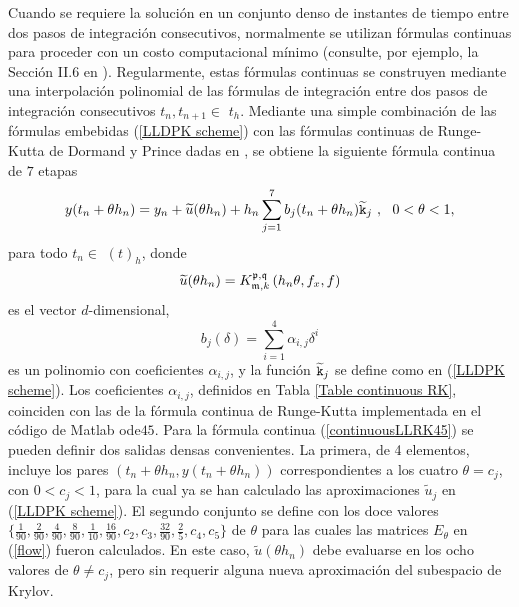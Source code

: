 Cuando se requiere la solución en un conjunto denso de instantes de tiempo entre dos pasos de integración consecutivos, normalmente se utilizan fórmulas continuas para proceder con un costo computacional mínimo (consulte, por ejemplo, la Sección II.6 en \cite{hairer1993solving}). Regularmente, estas fórmulas continuas se construyen mediante una interpolación polinomial de las fórmulas de integración entre dos pasos de integración consecutivos $t_{n},t_{n+1}\in $ $ t_{h}$. Mediante una simple combinación de las fórmulas embebidas (\ref{LLDPK scheme}) con las fórmulas continuas de Runge-Kutta de Dormand y Prince dadas en \cite{hairer1993solving}, se obtiene la siguiente fórmula continua de $7$ etapas
\begin{equation}
    y(t_{n}+\theta h_{n})=y_n+\widetilde{u}(\theta
    h_{n})+h_{n}\sum_{j=1}^{7}b_{j}(t_{n}+\theta h_{n})\widetilde{\mathtt{k}}_{j}\
    ,\ \ 0<\theta <1,  \label{continuousLLRK45}
\end{equation}%
 para todo $t_{n} \in $ $\left( t\right) _{h}$, donde
\begin{equation*}
    \widetilde{u}(\theta h_{n}) = K_{\mathfrak{m},k}^{\mathfrak{p},\mathfrak{q}}\left(h_n\theta, f_x , f \right)
\end{equation*}
    es el vector $d$-dimensional,
\begin{equation*}
    b_{j}(\delta )=\sum\limits_{i=1}^{4}\alpha _{i,j}\delta ^{i}
\end{equation*}
es un polinomio con coeficientes $\alpha _{i,j}$, y la función $\widetilde{\mathtt{k}}_{j}$ se define como en (\ref{LLDPK scheme}). Los coeficientes $\alpha _{i,j}$, definidos en
Tabla \ref{Table continuous RK}, coinciden con las de la
fórmula continua de Runge-Kutta implementada en el código de Matlab ode$45$. Para la fórmula continua (\ref{continuousLLRK45}) se pueden definir dos salidas densas convenientes. La primera, de 4 elementos, incluye los pares $(t_{n}+\theta h_{n},y(t_{n}+\theta h_{n}))$ correspondientes a los cuatro $\theta = c_j $, con $0<c_j<1$, para la cual ya se han calculado las aproximaciones $\widetilde{u}_j$ en (\ref{LLDPK scheme}). El segundo conjunto se define con los doce valores
$\{\frac{1}{90},\frac{2}{90},\frac{4}{90},\frac{8}{90},\frac{1}{10},\frac {16}{90},c_2,c_3,\frac{32}{90},\frac{2}{5},c_4,c_5\}$ de $\theta$ para las cuales las matrices $E_\theta$ en (\ref{flow}) fueron calculados. En este caso, $\widetilde{u}(\theta h_{n})$ debe evaluarse en los ocho valores de $\theta \ne c_j$, pero sin requerir alguna nueva aproximación del subespacio de Krylov.

